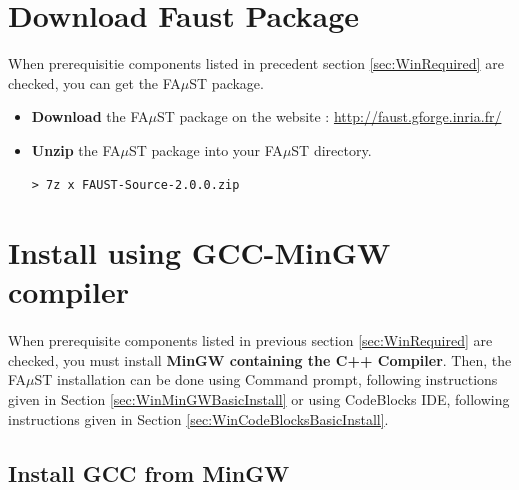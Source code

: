 \section{Download Faust Package}\label{sec:WinDownload}
When prerequisitie components listed in precedent section \ref{sec:WinRequired} are checked, you can get the FA$\mu$ST package.
\begin{itemize}
\item \textbf{Download} the FA$\mu$ST package on the website : \url{http://faust.gforge.inria.fr/}
\item \textbf{Unzip} the FA$\mu$ST package into your FA$\mu$ST directory. 
\begin{lstlisting}
> 7z x FAUST-Source-2.0.0.zip
\end{lstlisting}
\end{itemize}


\section{Install using GCC-MinGW compiler}\label{sec:WinInstallMinGW}

\paragraph{}When prerequisite components listed in previous section \ref{sec:WinRequired} are checked, you must install \textbf{MinGW containing the C++ Compiler}. 
Then, the FA$\mu$ST installation can be done using Command prompt, following instructions given in Section \ref{sec:WinMinGWBasicInstall} or using CodeBlocks IDE, following instructions given in Section \ref{sec:WinCodeBlocksBasicInstall}. 


\subsection{Install GCC from MinGW}
\label{sec:WinInstallCompilerMinGW}


